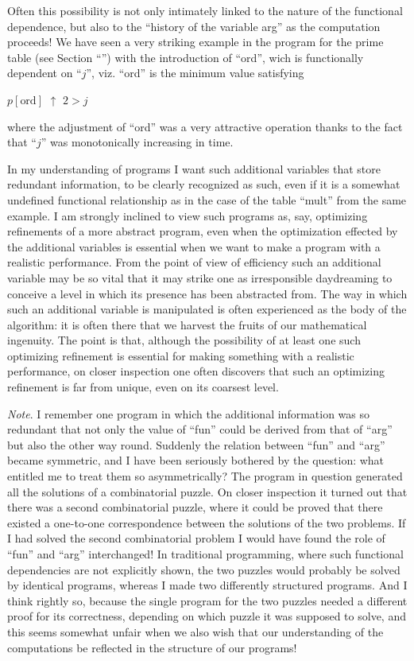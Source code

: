 \documentclass[twoside,11pt]{book}
\begin{document}
Often this possibility is not only intimately linked to the nature of the functional dependence, but also to the ``history of the variable arg'' as the computation proceeds! We have seen a very striking example in the program for the prime table (see Section ``'') with the introduction of ``ord'', wich is functionally dependent on ``$j$'', viz. ``ord'' is the minimum value satisfying
\medskip

{
	\setlength{\parindent}{8em}
	$p[\text{ord}]$ $\uparrow$ $2 > j$
}
\medskip

\noindent
where the adjustment of ``ord'' was a very attractive operation thanks to the fact that ``$j$'' was monotonically increasing in time.

In my understanding of programs I want such additional variables that store redundant information, to be clearly recognized as such, even if it is a somewhat undefined functional relationship as in the case of the table ``mult'' from the same example. I am strongly inclined to view such programs as, say, optimizing refinements of a more abstract program, even when the optimization effected by the additional variables is essential when we want to make a program with a realistic performance. From the point of view of efficiency such an additional variable may be so vital that it may strike one as irresponsible daydreaming to conceive a level in which its presence has been abstracted from. The way in which such an additional variable is manipulated is often experienced as the body of the algorithm: it is often there that we harvest the fruits of our mathematical ingenuity. The point is that, although the possibility of at least one such optimizing refinement is essential for making something with a realistic performance, on closer inspection one often discovers that such an optimizing refinement is far from unique, even on its coarsest level.

\noindent
\textit{Note}. I remember one program in which the additional information was so redundant that not only the value of ``fun'' could be derived from that of ``arg'' but also the other way round. Suddenly the relation between ``fun'' and ``arg'' became symmetric, and I have been seriously bothered by the question: what entitled me to treat them so asymmetrically? The program in question generated all the solutions of a combinatorial puzzle. On closer inspection it turned out that there was a second combinatorial puzzle, where it could be proved that there existed a one-to-one correspondence between the solutions of the two problems. If I had solved the second combinatorial problem I would have found the role of ``fun'' and ``arg'' interchanged! In traditional programming, where such functional dependencies are not explicitly shown, the two puzzles would probably be solved by identical programs, whereas I made two differently structured programs. And I think rightly so, because the single program for the two puzzles needed a different proof for its correctness, depending on which puzzle it was supposed to solve, and this seems somewhat unfair when we also wish that our understanding of the computations be reflected in the structure of our programs!
\end{document}
